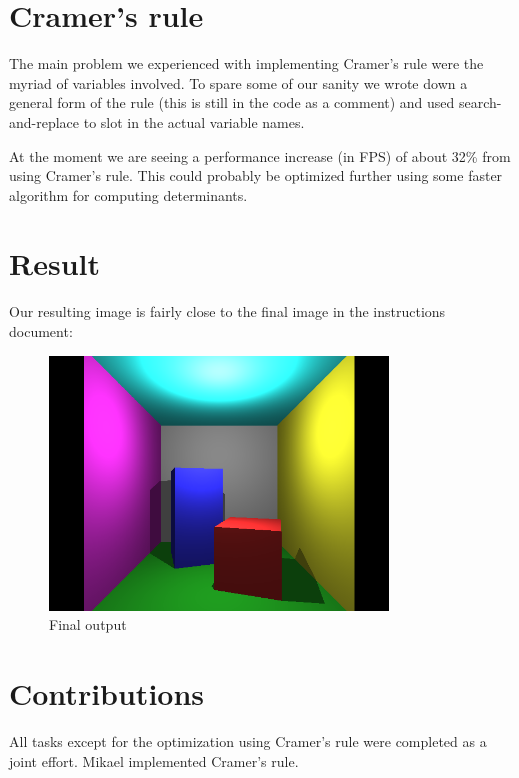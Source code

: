 \documentclass[a4paper,11pt]{article}
\begin{document}
\section*{Cramer's rule}
The main problem we experienced with implementing Cramer's rule were the myriad of
variables involved. To spare some of our sanity
we wrote down a general form of the rule (this is still in the code as a comment) and
used search-and-replace to slot in the actual variable names.

At the moment we are seeing a performance increase (in FPS) of about 32\% from using
Cramer's rule. This could probably be optimized further using some faster algorithm
for computing determinants.

\section*{Result}
Our resulting image is fairly close to the final image in the instructions document:
\begin{figure}[H]
    \centering
    \includegraphics[width=9cm]{final.png}
    \caption{Final output}
\end{figure}

\section*{Contributions}
All tasks except for the optimization using Cramer's rule were completed as a joint effort. Mikael
implemented Cramer's rule.
\end{document}
